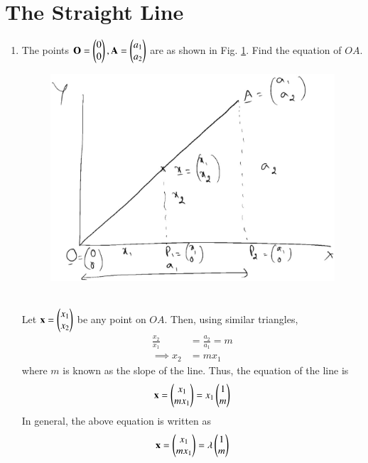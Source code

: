 \documentclass[journal,12pt,twocolumn]{IEEEtran}
\renewcommand\thesection{\arabic{section}}
\begin{document}
\section{The Straight Line}
\begin{enumerate}[label=\thesection.\arabic*
,ref=\thesection.\theenumi]
\item The points $\mathbf{O}=\begin{pmatrix}0\\0\end{pmatrix},\mathbf{A}=\begin{pmatrix}a_1\\a_2\end{pmatrix}$ are as shown in Fig. \ref{fig:line_homog}. 
Find the equation of  $OA$. 
\begin{figure}
\centering
\includegraphics[width=\columnwidth]{./figs/line_homog.eps}
\caption{}
\label{fig:line_homog}
\end{figure}
\\
\solution
Let $\mathbf{x}=\begin{pmatrix}x_1\\x_2\end{pmatrix}$ be any point on $OA$.
Then, using similar triangles,
\begin{align}
\frac{x_2}{x_1} &= \frac{a_2}{a_1} = m
\\
\implies x_2 &=  m x_1
\end{align}
where $m$ is known as the slope of the line. Thus, the equation of the line is
\begin{align}
\mathbf{x} = \begin{pmatrix}x_1\\m x_1\end{pmatrix} = x_1 \begin{pmatrix}1 \\ m\end{pmatrix}
\end{align}
In general, the above equation is written as
\begin{align}
\label{eq:homog}
\mathbf{x} = \begin{pmatrix}x_1\\m x_1\end{pmatrix} = \lambda \begin{pmatrix}1 \\ m\end{pmatrix}
\end{align}


\end{enumerate}
\end{document}
